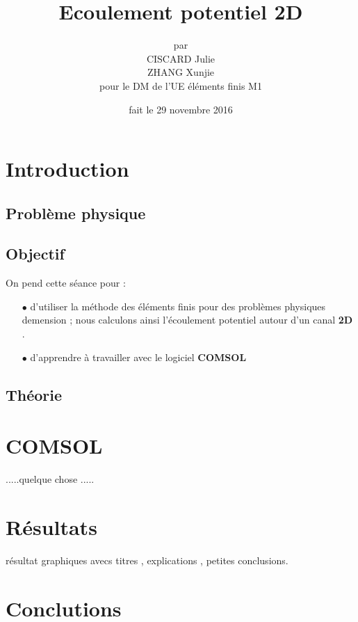 \documentclass[a4paper,10pt]{report} %
\title{\textbf{Ecoulement potentiel 2D}} %
\author{par\\CISCARD Julie\\ZHANG Xunjie\\pour le DM de l'UE éléments finis M1} %
\date{fait le 29 novembre 2016} %
\begin{document}
\maketitle %
\tableofcontents %
\listoffigures %


\chapter{Introduction}

\section{Problème physique}

\section{Objectif}

On pend cette séance pour :

\begin{itemize}
    \item[$\bullet$]d'utiliser la méthode des éléments finis pour des problèmes physiques demension ; nous calculons ainsi l'écoulement potentiel autour d'un canal \textbf{2D} .
    \item[$\bullet$]d'apprendre à travailler avec le logiciel \textbf{COMSOL} 
\end{itemize}
\section{Théorie}

\chapter{COMSOL}
.....quelque chose
.....
\chapter{Résultats}
résultat graphiques avecs titres , explications , petites conclusions.
\chapter{Conclutions}
\end{document}

